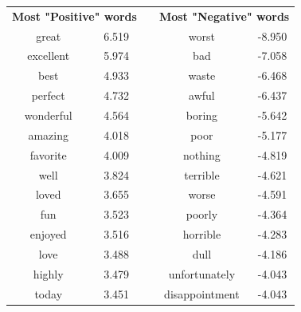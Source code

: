 \begin{table}[h]
    \centering
    \begin{tabular}{ccccc}
    \multicolumn{2}{c}{\textbf{Most "Positive" words}} &  & \multicolumn{2}{c}{\textbf{Most "Negative" words}} \\ \cline{1-2} \cline{4-5} 
    \multicolumn{1}{c|}{great}          & 6.519     &  & \multicolumn{1}{c|}{worst}            & -8.950  \\ \cline{1-2} \cline{4-5} 
    \multicolumn{1}{c|}{excellent}      & 5.974     &  & \multicolumn{1}{c|}{bad}              & -7.058  \\ \cline{1-2} \cline{4-5} 
    \multicolumn{1}{c|}{best}           & 4.933     &  & \multicolumn{1}{c|}{waste}            & -6.468  \\ \cline{1-2} \cline{4-5} 
    \multicolumn{1}{c|}{perfect}        & 4.732     &  & \multicolumn{1}{c|}{awful}            & -6.437  \\ \cline{1-2} \cline{4-5} 
    \multicolumn{1}{c|}{wonderful}      & 4.564     &  & \multicolumn{1}{c|}{boring}           & -5.642  \\ \cline{1-2} \cline{4-5} 
    \multicolumn{1}{c|}{amazing}        & 4.018     &  & \multicolumn{1}{c|}{poor}             & -5.177  \\ \cline{1-2} \cline{4-5} 
    \multicolumn{1}{c|}{favorite}       & 4.009     &  & \multicolumn{1}{c|}{nothing}          & -4.819  \\ \cline{1-2} \cline{4-5} 
    \multicolumn{1}{c|}{well}           & 3.824     &  & \multicolumn{1}{c|}{terrible}         & -4.621  \\ \cline{1-2} \cline{4-5} 
    \multicolumn{1}{c|}{loved}          & 3.655     &  & \multicolumn{1}{c|}{worse}            & -4.591  \\ \cline{1-2} \cline{4-5} 
    \multicolumn{1}{c|}{fun}            & 3.523     &  & \multicolumn{1}{c|}{poorly}           & -4.364  \\ \cline{1-2} \cline{4-5} 
    \multicolumn{1}{c|}{enjoyed}        & 3.516     &  & \multicolumn{1}{c|}{horrible}         & -4.283  \\ \cline{1-2} \cline{4-5} 
    \multicolumn{1}{c|}{love}           & 3.488     &  & \multicolumn{1}{c|}{dull}             & -4.186  \\ \cline{1-2} \cline{4-5} 
    \multicolumn{1}{c|}{highly}         & 3.479     &  & \multicolumn{1}{c|}{unfortunately}    & -4.043  \\ \cline{1-2} \cline{4-5} 
    \multicolumn{1}{c|}{today}          & 3.451     &  & \multicolumn{1}{c|}{disappointment}   & -4.043  \\ \cline{1-2} \cline{4-5} 

\end{tabular}
\end{table}
